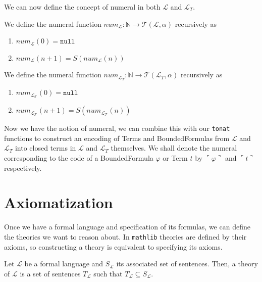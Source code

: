 We can now define the concept of numeral in both $\mathcal{L}$ and $\mathcal{L}_T$.
\begin{definition}\label{def:L-Numeral}
  \leanok
  We define the numeral function $num_{\mathcal{L}} : \mathbb{N} \to \mathcal{T}(\mathcal{L},\alpha)$ recursively as
  \begin{enumerate}
  \item $num_{\mathcal{L}}(0) = \texttt{null}$
  \item $num_{\mathcal{L}}(n + 1) = S(num_{\mathcal{L}}(n))$
  \end{enumerate}
\end{definition}

\begin{definition}\label{def:L_T-Numeral}
  \leanok
  We define the numeral function $num_{\mathcal{L}_T} : \mathbb{N} \to \mathcal{T}(\mathcal{L}_T,\alpha)$ recursively as
  \begin{enumerate}
  \item $num_{\mathcal{L_T}}(0) = \texttt{null}$
  \item $num_{\mathcal{L_T}}(n + 1) = S(num_{\mathcal{L_T}}(n))$
  \end{enumerate}
\end{definition}

Now we have the notion of numeral, we can combine this with our \texttt{tonat} functions to construct an encoding of Terms and BoundedFormulas from $\mathcal{L}$ and $\mathcal{L}_T$ into closed terms in $\mathcal{L}$ and $\mathcal{L}_T$ themselves. We shall denote the numeral corresponding to the code of a BoundedFormula $\varphi$ or Term $t$ by $\ulcorner \varphi \urcorner$ and $\ulcorner t \urcorner$ respectively.




\chapter{Axiomatization}\label{chapter:axiomatization}
Once we have a formal language and specification of its formulas, we can define the theories we want to reason about. In \texttt{mathlib} theories are defined by their axioms, so constructing a theory is equivalent to specifying its axioms. 

\begin{definition}[Theory]\label{def:FO-Theory}
  \leanok
  Let $\mathcal{L}$ be a formal language and $S_{\mathcal{L}}$ its associated set of sentences. Then, a theory of $\mathcal{L}$ is a set of sentences $T_{\mathcal{L}}$ such that $T_{\mathcal{L}} \subseteq S_{\mathcal{L}}$.
\end{definition}

